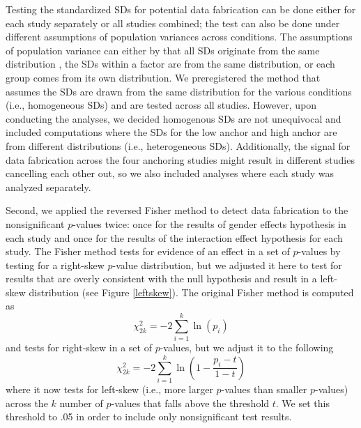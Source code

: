 \documentclass{article}
\begin{document}
Testing the standardized SDs for potential data fabrication can be done either for each study separately or all studies combined; the test can also be done under different assumptions of population variances across conditions. The assumptions of population variance can either by that all SDs originate from the same distribution \citep[as in][]{simonsohn2013}, the SDs within a factor are from the same distribution, or each group comes from its own distribution. We preregistered the method that assumes the SDs are drawn from the same distribution for the various conditions (i.e., homogeneous SDs) and are tested across all studies. However, upon conducting the analyses, we decided homogenous SDs are not unequivocal and included computations where the SDs for the low anchor and high anchor are from different distributions (i.e., heterogeneous SDs). Additionally, the signal for data fabrication across the four anchoring studies might result in different studies cancelling each other out, so we also included analyses where each study was analyzed separately.

Second, we applied the reversed Fisher method to detect data fabrication to the nonsignificant $p$-values twice: once for the results of gender effects hypothesis in each study and once for the results of the interaction effect hypothesis for each study. The Fisher method \citep{fisher1925} tests for evidence of an effect in a set of $p$-values by testing for a right-skew $p$-value distribution, but we adjusted it here to test for results that are overly consistent with the null hypothesis and result in a left-skew distribution (see Figure \ref{leftskew}). The original Fisher method is computed as
\begin{equation}
\chi^2_{2k}=-2\sum\limits^k_{i=1}\ln(p_i)
\label{fishertest}
\end{equation}
and tests for right-skew in a set of $p$-values, but we adjust it to the following
\begin{equation}
\chi^2_{2k}=-2\sum\limits^k_{i=1}\ln(1-\frac{p_i-t}{1-t})
\label{fisheradjusted}
\end{equation}
where it now tests for left-skew (i.e., more larger $p$-values than smaller $p$-values) across the $k$ number of $p$-values that falls above the threshold $t$. We set this threshold to .05 in order to include only nonsignificant test results.
\end{document}
